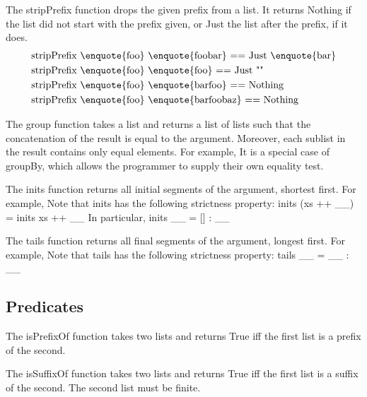The stripPrefix function drops the given prefix from a list. It returns Nothing if the list did not start with the prefix given, or Just the list after the prefix, if it does.
\begin{align*}
	&\text{stripPrefix \enquote{foo} \enquote{foobar} == Just \enquote{bar}}\\
	&\text{stripPrefix \enquote{foo} \enquote{foo} == Just ""}\\
	&\text{stripPrefix \enquote{foo} \enquote{barfoo} == Nothing}\\
	&\text{stripPrefix \enquote{foo} \enquote{barfoobaz} == Nothing}
\end{align*}

The group function takes a list and returns a list of lists such that the concatenation of the result is equal to the argument. Moreover, each sublist in the result contains only equal elements. For example,
It is a special case of groupBy, which allows the programmer to supply their own equality test.

The inits function returns all initial segments of the argument, shortest first. For example,
Note that inits has the following strictness property: inits (xs ++ \_\textbar\_) = inits xs ++ \_\textbar\_
In particular, inits \_\textbar\_ = [] : \_\textbar\_

The tails function returns all final segments of the argument, longest first. For example,
Note that tails has the following strictness property: tails \_\textbar\_ = \_\textbar\_ : \_\textbar\_

\subsection{Predicates}
The isPrefixOf function takes two lists and returns True iff the first list is a prefix of the second.

The isSuffixOf function takes two lists and returns True iff the first list is a suffix of the second. The second list must be finite.

